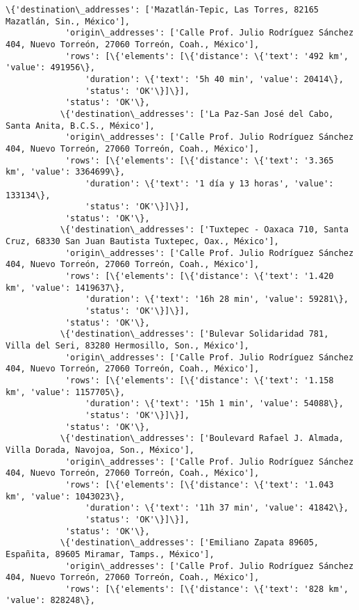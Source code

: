 \documentclass[11pt]{article}
\begin{document}
\begin{Verbatim}[commandchars=\\\{\}]
           \{'destination\_addresses': ['Mazatlán-Tepic, Las Torres, 82165 Mazatlán, Sin., México'],
            'origin\_addresses': ['Calle Prof. Julio Rodríguez Sánchez 404, Nuevo Torreón, 27060 Torreón, Coah., México'],
            'rows': [\{'elements': [\{'distance': \{'text': '492 km', 'value': 491956\},
                'duration': \{'text': '5h 40 min', 'value': 20414\},
                'status': 'OK'\}]\}],
            'status': 'OK'\},
           \{'destination\_addresses': ['La Paz-San José del Cabo, Santa Anita, B.C.S., México'],
            'origin\_addresses': ['Calle Prof. Julio Rodríguez Sánchez 404, Nuevo Torreón, 27060 Torreón, Coah., México'],
            'rows': [\{'elements': [\{'distance': \{'text': '3.365 km', 'value': 3364699\},
                'duration': \{'text': '1 día y 13 horas', 'value': 133134\},
                'status': 'OK'\}]\}],
            'status': 'OK'\},
           \{'destination\_addresses': ['Tuxtepec - Oaxaca 710, Santa Cruz, 68330 San Juan Bautista Tuxtepec, Oax., México'],
            'origin\_addresses': ['Calle Prof. Julio Rodríguez Sánchez 404, Nuevo Torreón, 27060 Torreón, Coah., México'],
            'rows': [\{'elements': [\{'distance': \{'text': '1.420 km', 'value': 1419637\},
                'duration': \{'text': '16h 28 min', 'value': 59281\},
                'status': 'OK'\}]\}],
            'status': 'OK'\},
           \{'destination\_addresses': ['Bulevar Solidaridad 781, Villa del Seri, 83280 Hermosillo, Son., México'],
            'origin\_addresses': ['Calle Prof. Julio Rodríguez Sánchez 404, Nuevo Torreón, 27060 Torreón, Coah., México'],
            'rows': [\{'elements': [\{'distance': \{'text': '1.158 km', 'value': 1157705\},
                'duration': \{'text': '15h 1 min', 'value': 54088\},
                'status': 'OK'\}]\}],
            'status': 'OK'\},
           \{'destination\_addresses': ['Boulevard Rafael J. Almada, Villa Dorada, Navojoa, Son., México'],
            'origin\_addresses': ['Calle Prof. Julio Rodríguez Sánchez 404, Nuevo Torreón, 27060 Torreón, Coah., México'],
            'rows': [\{'elements': [\{'distance': \{'text': '1.043 km', 'value': 1043023\},
                'duration': \{'text': '11h 37 min', 'value': 41842\},
                'status': 'OK'\}]\}],
            'status': 'OK'\},
           \{'destination\_addresses': ['Emiliano Zapata 89605, Españita, 89605 Miramar, Tamps., México'],
            'origin\_addresses': ['Calle Prof. Julio Rodríguez Sánchez 404, Nuevo Torreón, 27060 Torreón, Coah., México'],
            'rows': [\{'elements': [\{'distance': \{'text': '828 km', 'value': 828248\},

\end{Verbatim}
\end{document}
